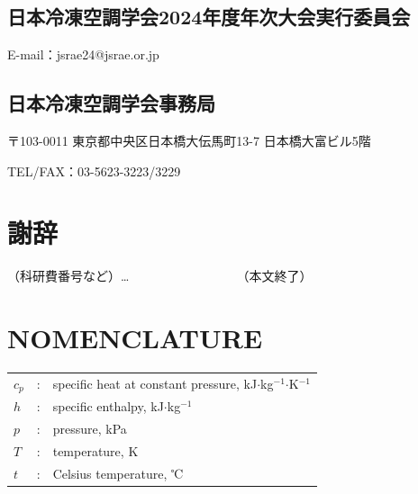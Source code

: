 \documentclass[A4,10pt,fleqn,dvipdfmx]{jarticle}
\begin{document}
\subsection{日本冷凍空調学会2024年度年次大会実行委員会}
E-mail：jsrae24@jsrae.or.jp
\subsection{日本冷凍空調学会事務局}
〒103-0011 東京都中央区日本橋大伝馬町13-7 日本橋大富ビル5階

TEL/FAX：03-5623-3223/3229

\section*{謝辞}
（科研費番号など）…　　　　　　　　　（本文終了）

\section*{NOMENCLATURE}
\begin{tabular}{lcl}
$c_p$ & : & specific heat at constant pressure, kJ$\cdot$kg$^{-1}$$\cdot$K$^{-1}$ \\
$h$ &	: & specific enthalpy, kJ$\cdot$kg$^{-1}$ \\
$p$ &	: & pressure, kPa \\
$T$ &	: & temperature, K \\
$t$ &	: & Celsius temperature, ℃ \\
\end{tabular}



  

\end{document}
